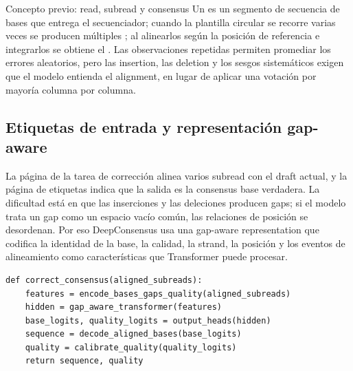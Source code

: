 \begin{knowledgebox}{Concepto previo: read, subread y consensus}
Un  es un segmento de secuencia de bases que entrega el secuenciador; cuando la plantilla circular se recorre varias veces se producen múltiples ; al alinearlos según la posición de referencia e integrarlos se obtiene el . Las observaciones repetidas permiten promediar los errores aleatorios, pero las insertion, las deletion y los sesgos sistemáticos exigen que el modelo entienda el alignment, en lugar de aplicar una votación por mayoría columna por columna.
\end{knowledgebox}

\subsection{Etiquetas de entrada y representación gap-aware}

La página de la tarea de corrección alinea varios subread con el draft actual, y la página de etiquetas indica que la salida es la consensus base verdadera. La dificultad está en que las inserciones y las deleciones producen gaps; si el modelo trata un gap como un espacio vacío común, las relaciones de posición se desordenan. Por eso DeepConsensus usa una gap-aware representation que codifica la identidad de la base, la calidad, la strand, la posición y los eventos de alineamiento como características que Transformer puede procesar.




\begin{lstlisting}[caption={Flujo de corrección al estilo DeepConsensus (pseudocódigo conceptual)}]
def correct_consensus(aligned_subreads):
    features = encode_bases_gaps_quality(aligned_subreads)
    hidden = gap_aware_transformer(features)
    base_logits, quality_logits = output_heads(hidden)
    sequence = decode_aligned_bases(base_logits)
    quality = calibrate_quality(quality_logits)
    return sequence, quality
\end{lstlisting}

